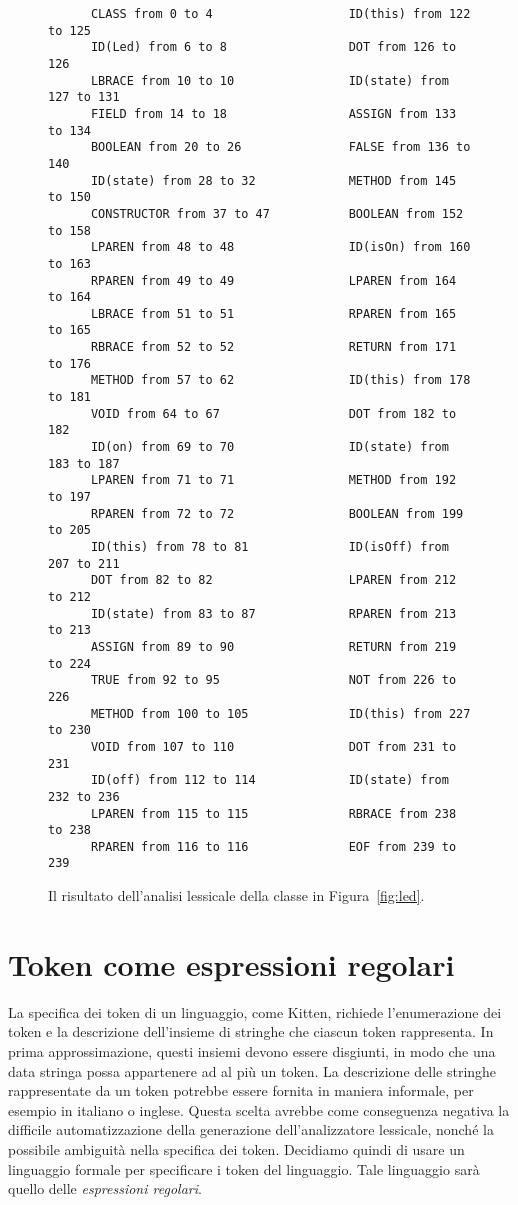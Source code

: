 \begin{figure}[t]
\begin{verbatim}
      CLASS from 0 to 4                   ID(this) from 122 to 125
      ID(Led) from 6 to 8                 DOT from 126 to 126
      LBRACE from 10 to 10                ID(state) from 127 to 131
      FIELD from 14 to 18                 ASSIGN from 133 to 134
      BOOLEAN from 20 to 26               FALSE from 136 to 140
      ID(state) from 28 to 32             METHOD from 145 to 150
      CONSTRUCTOR from 37 to 47           BOOLEAN from 152 to 158
      LPAREN from 48 to 48                ID(isOn) from 160 to 163
      RPAREN from 49 to 49                LPAREN from 164 to 164
      LBRACE from 51 to 51                RPAREN from 165 to 165
      RBRACE from 52 to 52                RETURN from 171 to 176
      METHOD from 57 to 62                ID(this) from 178 to 181
      VOID from 64 to 67                  DOT from 182 to 182
      ID(on) from 69 to 70                ID(state) from 183 to 187
      LPAREN from 71 to 71                METHOD from 192 to 197
      RPAREN from 72 to 72                BOOLEAN from 199 to 205
      ID(this) from 78 to 81              ID(isOff) from 207 to 211
      DOT from 82 to 82                   LPAREN from 212 to 212
      ID(state) from 83 to 87             RPAREN from 213 to 213
      ASSIGN from 89 to 90                RETURN from 219 to 224
      TRUE from 92 to 95                  NOT from 226 to 226
      METHOD from 100 to 105              ID(this) from 227 to 230
      VOID from 107 to 110                DOT from 231 to 231
      ID(off) from 112 to 114             ID(state) from 232 to 236
      LPAREN from 115 to 115              RBRACE from 238 to 238
      RPAREN from 116 to 116              EOF from 239 to 239
\end{verbatim}
\caption{Il risultato dell'analisi lessicale della classe in Figura~\ref{fig:led}.}\label{fig:led_lexical}
\end{figure}
%
\section{Token come espressioni regolari}\label{sec:regular_expressions}
%
La specifica dei token di un linguaggio, come Kitten, richiede l'enumerazione
dei token e la descrizione dell'insieme di stringhe che ciascun token
rappresenta. In prima approssimazione,
questi insiemi devono essere disgiunti, in modo che una data
stringa possa appartenere ad al pi\`u un token. La descrizione delle stringhe
rappresentate da un token potrebbe essere fornita in maniera informale, per
esempio in italiano o inglese. Questa scelta avrebbe come conseguenza
negativa la difficile automatizzazione della generazione dell'analizzatore
lessicale, nonch\'e la possibile ambiguit\`a nella specifica dei token.
Decidiamo quindi di usare un linguaggio formale per specificare i token
del linguaggio. Tale linguaggio sar\`a quello delle
\emph{espressioni regolari}.


